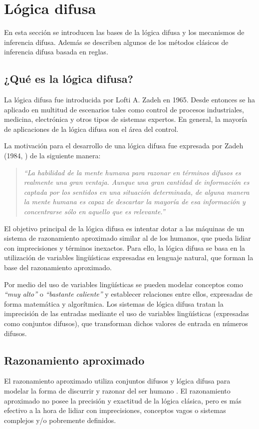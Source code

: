 \chapter{Lógica difusa}
\label{cha:logica-difusa}
En esta sección se introducen las bases de la lógica difusa y los mecanismos de inferencia difusa. Además se describen algunos de los métodos clásicos de inferencia difusa basada en reglas.

\section{¿Qué es la lógica difusa?}
La lógica difusa fue introducida por Lofti A. Zadeh en 1965. Desde entonces se ha aplicado en multitud de escenarios tales como control de procesos industriales, medicina, electrónica y otros tipos de sistemas expertos. En general, la mayoría de aplicaciones de la lógica difusa son el área del control.

La motivación para el desarrollo de una lógica difusa fue expresada por Zadeh (1984, \cite{Zadeh1984}) de la siguiente manera:
\begin{quote}
\emph{``La habilidad de la mente humana para razonar en términos difusos es realmente una gran ventaja. Aunque una gran cantidad de información es captada por los sentidos en una situación determinada, de alguna manera la mente humana es capaz de descartar la mayoría de esa información y concentrarse sólo en aquello que es relevante.''}
\end{quote}
El objetivo principal de la lógica difusa es intentar dotar a las máquinas de un sistema de razonamiento aproximado similar al de los humanos, que pueda lidiar con imprecisiones y términos inexactos. Para ello, la lógica difusa se basa en la utilización de variables lingüísticas expresadas en lenguaje natural, que forman la base del razonamiento aproximado. 

Por medio del uso de variables lingüísticas se pueden modelar conceptos como \emph{``muy alto''} o \emph{``bastante caliente''} y establecer relaciones entre ellos, expresadas de forma matemática y algorítmica. Los sistemas de lógica difusa tratan la imprecisión de las entradas mediante el uso de variables lingüísticas (expresadas como conjuntos difusos), que transforman dichos valores de entrada en números difusos.

\section{Razonamiento aproximado}
El razonamiento aproximado utiliza conjuntos difusos y lógica difusa para modelar la forma de discurrir y razonar del ser humano \cite{bojadziev1995}. El razonamiento aproximado no posee la precisión y exactitud de la lógica clásica, pero es más efectivo a la hora de lidiar con imprecisiones, conceptos vagos o sistemas complejos y/o pobremente definidos.

